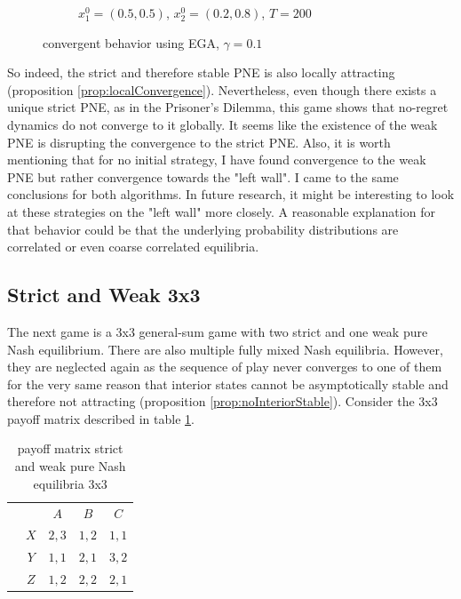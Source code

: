 \begin{figure}[H]
\begin{subfigure}{.5\textwidth}
    \caption{$x_{1}^0 = (0.5,0.5)$, $x_{2}^0 = (0.2,0.8)$, $T = 200$}
    \label{fig:Weak3b}
\end{subfigure}
\caption{convergent behavior using EGA, $\gamma = 0.1$}
\label{fig:2x2Weak3}
\end{figure}

So indeed, the strict and therefore stable PNE is also locally attracting (proposition \ref{prop:localConvergence}). Nevertheless, even though there exists a unique strict PNE, as in the Prisoner's Dilemma, this game shows that no-regret dynamics do not converge to it globally. It seems like the existence of the weak PNE is disrupting the convergence to the strict PNE. Also, it is worth mentioning that for no initial strategy, I have found convergence to the weak PNE but rather convergence towards the "left wall". I came to the same conclusions for both algorithms. In future research, it might be interesting to look at these strategies on the "left wall" more closely. A reasonable explanation for that behavior could be that the underlying probability distributions are correlated or even coarse correlated equilibria. 


\subsection{Strict and Weak 3x3}\label{subsection:StrictAndWeak3x3}

The next game is a 3x3 general-sum game with two strict and one weak pure Nash equilibrium. There are also multiple fully mixed Nash equilibria. However, they are neglected again as the sequence of play never converges to one of them for the very same reason that interior states cannot be asymptotically stable and therefore not attracting (proposition \ref{prop:noInteriorStable}). Consider the 3x3 payoff matrix described in table \ref{tab:payoffStrictAndWeak3x3}. 

\begin{table}[H]\centering
\setlength{\extrarowheight}{2pt}
\begin{tabular}{cc|c|c|c|}
  & \multicolumn{1}{c}{} & \multicolumn{1}{c}{$A$}  & \multicolumn{1}{c}{$B$}  & \multicolumn{1}{c}{$C$} \\\cline{3-5}
            & $X$ & $2,3$ & $1,2$ & $1,1$ \\ \cline{3-5}
            & $Y$ & $1,1$ & $2,1$ & $3,2$ \\\cline{3-5}
            & $Z$ & $1,2$ & $2,2$ & $2,1$ \\\cline{3-5}
\end{tabular}\caption{\label{tab:payoffStrictAndWeak3x3}payoff matrix strict and weak pure Nash equilibria 3x3}
\end{table}

